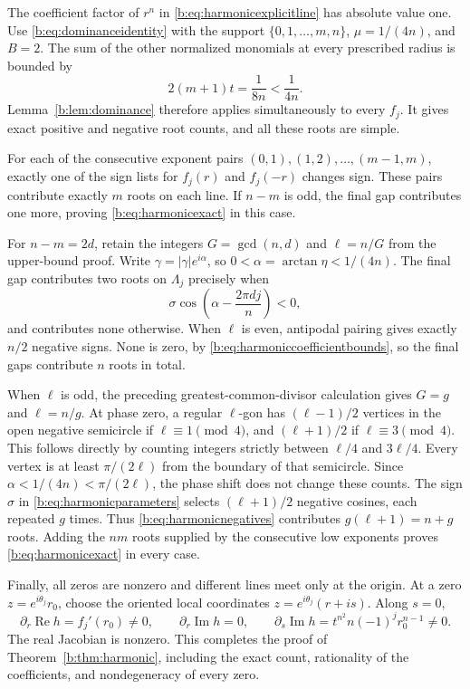 \documentclass[UTF8,11pt]{ctexart}
\theoremstyle{definition}
\numberwithin{equation}{section}
\DeclareMathOperator{\Rea}{Re}\DeclareMathOperator{\Ima}{Im}
\begin{document}
The coefficient factor of $r^n$ in
\eqref{b:eq:harmonicexplicitline} has absolute value one.
Use \eqref{b:eq:dominanceidentity} with the support
$\{0,1,\ldots,m,n\}$, $\mu=1/(4n)$, and $B=2$.
The sum of the other normalized monomials at every prescribed
radius is bounded by
\[
 2(m+1)t=\frac1{8n}<\frac1{4n}.
\]
Lemma~\ref{b:lem:dominance} therefore applies simultaneously to every
$f_j$. It gives exact positive and negative root counts, and all
these roots are simple.

For each of the consecutive exponent pairs
$(0,1),(1,2),\ldots,(m-1,m)$, exactly one of the sign lists for
$f_j(r)$ and $f_j(-r)$ changes sign. These pairs contribute exactly
$m$ roots on each line. If $n-m$ is odd, the final gap contributes
one more, proving \eqref{b:eq:harmonicexact} in this case.

For $n-m=2d$, retain the integers $G=\gcd(n,d)$ and $\ell=n/G$
from the upper-bound proof. Write
$\gamma=|\gamma|e^{i\alpha}$, so
$0<\alpha=\arctan\eta<1/(4n)$. The final gap contributes two
roots on $\Lambda_j$ precisely when
\begin{equation}\label{b:eq:harmonicnegatives}
 \sigma\cos\left(\alpha-\frac{2\pi dj}{n}\right)<0,
\end{equation}
and contributes none otherwise. When $\ell$ is even, antipodal
pairing gives exactly $n/2$ negative signs. None is zero, by
\eqref{b:eq:harmoniccoefficientbounds}, so the final gaps contribute
$n$ roots in total.

When $\ell$ is odd, the preceding greatest-common-divisor
calculation gives $G=g$ and $\ell=n/g$. At phase zero, a regular
$\ell$-gon has $(\ell-1)/2$ vertices in the open negative
semicircle if $\ell\equiv1\pmod4$, and $(\ell+1)/2$ if
$\ell\equiv3\pmod4$. This follows directly by counting integers
strictly between $\ell/4$ and $3\ell/4$.
Every vertex is at least $\pi/(2\ell)$ from the boundary of that
semicircle. Since $\alpha<1/(4n)<\pi/(2\ell)$, the phase shift
does not change these counts. The sign $\sigma$ in
\eqref{b:eq:harmonicparameters} selects $(\ell+1)/2$ negative
cosines, each repeated $g$ times. Thus
\eqref{b:eq:harmonicnegatives} contributes $g(\ell+1)=n+g$ roots.
Adding the $nm$ roots supplied by the consecutive low exponents
proves \eqref{b:eq:harmonicexact} in every case.

Finally, all zeros are nonzero and different lines meet only at the
origin. At a zero $z=e^{i\theta_j}r_0$, choose the oriented local
coordinates $z=e^{i\theta_j}(r+is)$. Along $s=0$,
\[
 \partial_r\Rea h=f_j'(r_0)\ne0,\qquad
 \partial_r\Ima h=0,\qquad
 \partial_s\Ima h=t^{n^2}n(-1)^jr_0^{n-1}\ne0.
\]
The real Jacobian is nonzero. This completes the proof of
Theorem~\ref{b:thm:harmonic}, including the exact count, rationality
of the coefficients, and nondegeneracy of every zero.
\end{document}
